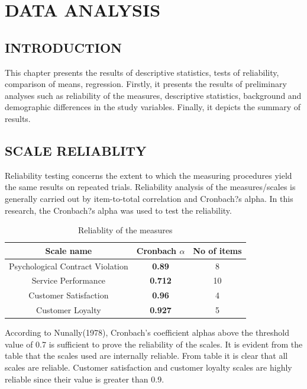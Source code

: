 \documentclass[a4paper, 12pt]{extarticle}
\begin{document}
{\section{DATA ANALYSIS}
\subsection{INTRODUCTION}
This chapter presents the results of descriptive statistics, tests of reliability, comparison of means, regression. Firstly, it presents the results of preliminary analyses such as reliability of the measures, descriptive statistics, background and demographic differences in the study variables. Finally, it depicts the summary of results.

\subsection{SCALE RELIABLITY}
Reliability testing concerns the extent to which the measuring procedures yield the same results on repeated trials. Reliability analysis of the measures/scales is generally carried out by item-to-total correlation and Cronbach?s alpha. In this research, the Cronbach?s  alpha was used to test the reliability.
\begin{table}[H]
\centering
\begin{tabular}{|c|c|c|}
\hline
\textbf{Scale name} & \textbf{Cronbach $\alpha$} & \textbf{No of items}\\
\hline
Psychological Contract Violation & \textbf{0.89} & 8\\
\hline
Service Performance & \textbf{0.712} & 10\\
\hline
Customer Satisfaction & \textbf{0.96} & 4\\
\hline
Customer Loyalty & \textbf{0.927} & 5 \\
\hline
\end{tabular}
\caption{Reliablity of the measures}
\end{table}

\par According to Nunally(1978), Cronbach's coefficient alphas above the threshold value of 0.7 is sufficient to prove the reliability of the scales. It is evident from the table that the scales used are internally reliable. From table it is clear that all scales are reliable. Customer satisfaction and customer loyalty scales are highly reliable since their value is greater than 0.9.

}
\end{document}
